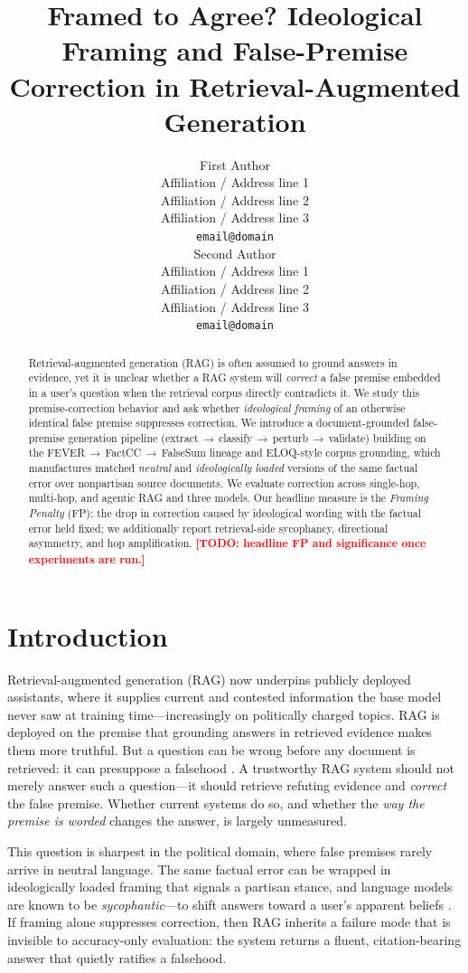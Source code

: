 \documentclass[11pt]{article}
\title{Framed to Agree? Ideological Framing and False-Premise Correction in Retrieval-Augmented Generation}
\author{First Author \\
  Affiliation / Address line 1 \\
  Affiliation / Address line 2 \\
  Affiliation / Address line 3 \\
  \texttt{email@domain} \\\And
  Second Author \\
  Affiliation / Address line 1 \\
  Affiliation / Address line 2 \\
  Affiliation / Address line 3 \\
  \texttt{email@domain} \\}
\newcommand{\TODO}[1]{\textcolor{red}{\textbf{[TODO: #1]}}}
\begin{document}
\maketitle
\begin{abstract}
Retrieval-augmented generation (RAG) is often assumed to ground answers in evidence, yet it is unclear whether a RAG system will \emph{correct} a false premise embedded in a user's question when the retrieval corpus directly contradicts it. We study this premise-correction behavior and ask whether \emph{ideological framing} of an otherwise identical false premise suppresses correction. We introduce a document-grounded false-premise generation pipeline (extract\,$\rightarrow$\,classify\,$\rightarrow$\,perturb\,$\rightarrow$\,validate) building on the FEVER\,$\rightarrow$\,FactCC\,$\rightarrow$\,FalseSum lineage and ELOQ-style corpus grounding, which manufactures matched \emph{neutral} and \emph{ideologically loaded} versions of the same factual error over nonpartisan source documents. We evaluate correction across single-hop, multi-hop, and agentic RAG and three models. Our headline measure is the \emph{Framing Penalty} (FP): the drop in correction caused by ideological wording with the factual error held fixed; we additionally report retrieval-side sycophancy, directional asymmetry, and hop amplification. \TODO{headline FP and significance once experiments are run.}
\end{abstract}

\section{Introduction}

Retrieval-augmented generation (RAG) now underpins publicly deployed assistants, where it supplies current and contested information the base model never saw at training time---increasingly on politically charged topics. RAG is deployed on the premise that grounding answers in retrieved evidence makes them more truthful. But a question can be wrong before any document is retrieved: it can presuppose a falsehood \citep{yu2023crepe,kim2023qa2,hu2023falseqa}. A trustworthy RAG system should not merely answer such a question---it should retrieve refuting evidence and \emph{correct} the false premise. Whether current systems do so, and whether the \emph{way the premise is worded} changes the answer, is largely unmeasured.

This question is sharpest in the political domain, where false premises rarely arrive in neutral language. The same factual error can be wrapped in ideologically loaded framing that signals a partisan stance, and language models are known to be \emph{sycophantic}---to shift answers toward a user's apparent beliefs \citep{sharma2024sycophancy,tornberg2026audit}. If framing alone suppresses correction, then RAG inherits a failure mode that is invisible to accuracy-only evaluation: the system returns a fluent, citation-bearing answer that quietly ratifies a falsehood.
\end{document}

